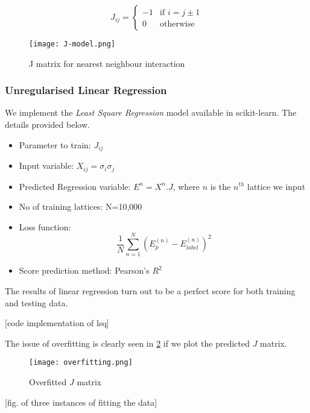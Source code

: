 \begin{equation*}
    J_{ij} = \left\{
        \begin{array}{ll}
            -1 & \mbox{if } i = j \pm 1\\
            0 & \mbox{otherwise}
        \end{array}
    \right.
\end{equation*}

\begin{figure}
    \centering
    \texttt{[image: J-model.png]}
    \caption{J matrix for nearest neighbour interaction}
    \label{fig:j-matrix}
\end{figure}

\subsubsection{Unregularised Linear Regression}
We implement the \emph{Least Square Regression} model available in scikit-learn. The details provided below.
\begin{itemize}
    \item Parameter to train: \(J_{ij}\)
    \item Input variable: \(X_{ij}=\sigma_i\sigma_j\)
    \item Predicted Regression variable: \(E^n=X^n.J\), where $n$ is the $n^{th}$ lattice we input
    \item No of training lattices: N=10,000
    \item Loss function:
        \begin{equation*}
           \frac{1}{N} \sum_{n=1}^N(E_p^{(n)}-E_{label}^{(n)})^2
        \end{equation*}
    \item Score prediction method: Pearson's \(R^2\)
\end{itemize}

The results of linear regression turn out to be a perfect score for both training and testing data.

[code implementation of lsq]

The issue of overfitting is clearly seen in \cref{fig:overfit} if we plot the predicted $J$ matrix.

\begin{figure}[h!]
    \centering
    \texttt{[image: overfitting.png]}
    \caption{Overfitted $J$ matrix}
    \label{fig:overfit}
\end{figure}


[fig. of three instances of fitting the data]

